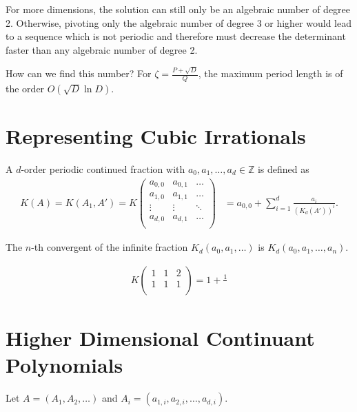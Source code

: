 \documentclass[english,version-2020-11]{uzl-thesis}
\newcommand\Z{{\mathbb Z}}
\begin{document}
For more dimensions, the solution can still only be an algebraic number of degree 2.
Otherwise, pivoting only the algebraic number of degree 3 or higher would lead to
a sequence which is not periodic and therefore must decrease the determinant
faster than any algebraic number of degree 2.

How can we find this number?
For $\zeta = \frac{P+\sqrt{D}}{Q}$, the maximum period length is of the order $O(\sqrt{D} \ln D)$.

\section{Representing Cubic Irrationals}

\begin{definition}
  A $d$-order periodic continued fraction with $a_0, a_1, \dots, a_d \in \Z$ is defined as
  \begin{align*}
    K(A) = K(A_1, A') = K\begin{pmatrix}
      a_{0,0} & a_{0,1} & \dots \\
      a_{1,0} & a_{1,1} & \dots \\
      \vdots  & \vdots  & \ddots \\
      a_{d,0} & a_{d,1} & \dots \\
    \end{pmatrix}
    & = a_{0,0} + \sum_{i=1}^d \frac{a_i}{(K_d(A'))^i}.
  \end{align*}
\end{definition}

\begin{definition}
  The $n$-th convergent of the infinite fraction $K_d(a_0, a_1, \dots)$ is $K_d(a_0, a_1, \dots, a_n)$.
\end{definition}

\begin{align*}
  K
  \begin{pmatrix}
    1 & 1 & 2 \\
    1 & 1 & 1 \\
  \end{pmatrix} =
  1 + \frac{1}{}
\end{align*}

\section{Higher Dimensional Continuant Polynomials}

Let $A = (A_1, A_2, \dots)$ and $A_i = (a_{1,i}, a_{2,i}, \dots, a_{d,i})$.
\end{document}
